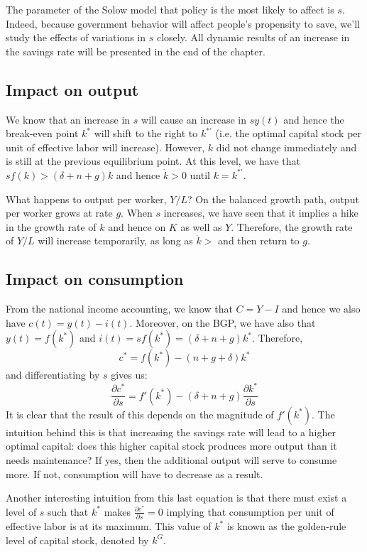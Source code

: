 \documentclass[12pt]{report}
\begin{document}
The parameter of the Solow model that policy is the most likely to affect is $s$. Indeed, because government behavior will affect people's propensity to save, we'll study the effects of variations in $s$ closely. All dynamic results of an increase in the savings rate will be presented in the end of the chapter.

\subsection{Impact on output}

We know that an increase in $s$ will cause an increase in $sy(t)$ and hence the break-even point $k^*$ will shift to the right to $k^{*'}$ (i.e. the optimal capital stock per unit of effective labor will increase). However, $k$ did not change immediately and is still at the previous equilibrium point. At this level, we have that $sf(k) > (\delta + n + g)k$ and hence $\dot{k} > 0$ until $k = k^{*'}$.

What happens to output per worker, $Y/L$? On the balanced growth path, output per worker grows at rate $g$. When $s$ increases, we have seen that it implies a hike in the growth rate of $k$ and hence on $K$ as well as $Y$. Therefore, the growth rate of $Y/L$ will increase temporarily, as long as $\dot{k}>$ and then return to $g$.

\subsection{Impact on consumption}

From the national income accounting, we know that $C = Y - I$ and hence we also have $c(t) = y(t) - i(t)$. Moreover, on the BGP, we have also that $y(t) = f(k^*)$ and $i(t) = sf(k^*) = (\delta + n +g)k^*$. Therefore, $$c^* = f(k^*) - (n+g+\delta)k^*$$ and differentiating by $s$ gives us: $$\frac{\partial c^*}{\partial s} = f'(k^*) - (\delta + n +g)\frac{\partial k^*}{\partial s} $$ It is clear that the result of this depends on the magnitude of $f'(k^*)$. The intuition behind this is that increasing the savings rate will lead to a higher optimal capital: does this higher capital stock produces more output than it needs maintenance? If yes, then the additional output will serve to consume more. If not, consumption will have to decrease as a result.

Another interesting intuition from this last equation is that there must exist a level of $s$ such that $k^*$ makes $\frac{\partial c^*}{\partial s} = 0$ implying that consumption per unit of effective labor is at its maximum. This value of $k^*$ is known as the golden-rule level of capital stock, denoted by $k^G$.
\end{document}
